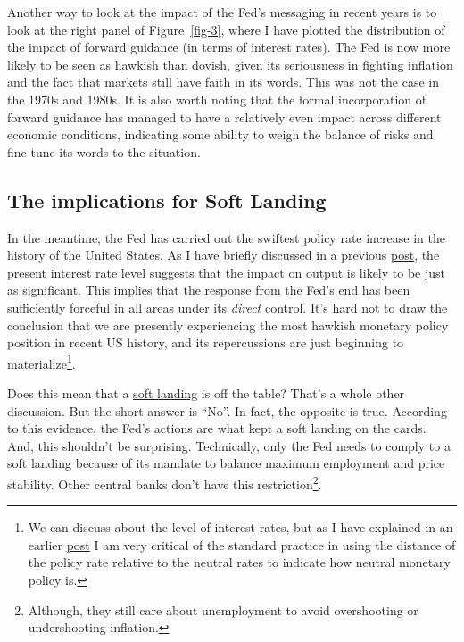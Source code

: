 \documentclass[
  letterpaper,
  DIV=11,
  numbers=noendperiod]{scrartcl}
\begin{document}
Another way to look at the impact of the Fed's messaging in recent years
is to look at the right panel of Figure~\ref{fig-3}, where I have
plotted the distribution of the impact of forward guidance (in terms of
interest rates). The Fed is now more likely to be seen as hawkish than
dovish, given its seriousness in fighting inflation and the fact that
markets still have faith in its words. This was not the case in the
1970s and 1980s. It is also worth noting that the formal incorporation
of forward guidance has managed to have a relatively even impact across
different economic conditions, indicating some ability to weigh the
balance of risks and fine-tune its words to the situation.

\hypertarget{the-implications-for-soft-landing}{%
\subsection{The implications for Soft
Landing}\label{the-implications-for-soft-landing}}

In the meantime, the Fed has carried out the swiftest policy rate
increase in the history of the United States. As I have briefly
discussed in a previous
\href{https://msh855.github.io/TheQuantEconomist/posts/fed_and_private_consumption/the_fed_and_private_consumption.html}{post},
the present interest rate level suggests that the impact on output is
likely to be just as significant. This implies that the response from
the Fed's end has been sufficiently forceful in all areas under its
\emph{direct} control. It's hard not to draw the conclusion that we are
presently experiencing the most hawkish monetary policy position in
recent US history, and its repercussions are just beginning to
materialize\footnote{We can discuss about the level of interest rates,
  but as I have explained in an earlier
  \href{https://msh855.github.io/TheQuantEconomist/posts/fed_and_private_consumption/the_fed_and_private_consumption.html}{post}
  I am very critical of the standard practice in using the distance of
  the policy rate relative to the neutral rates to indicate how neutral
  monetary policy is.}.

Does this mean that a
\href{https://www.investopedia.com/terms/s/softlanding.asp}{soft
landing} is off the table? That's a whole other discussion. But the
short answer is ``No''. In fact, the opposite is true. According to this
evidence, the Fed's actions are what kept a soft landing on the cards.
And, this shouldn't be surprising. Technically, only the Fed needs to
comply to a soft landing because of its mandate to balance maximum
employment and price stability. Other central banks don't have this
restriction\footnote{Although, they still care about unemployment to
  avoid overshooting or undershooting inflation.}.
\end{document}
